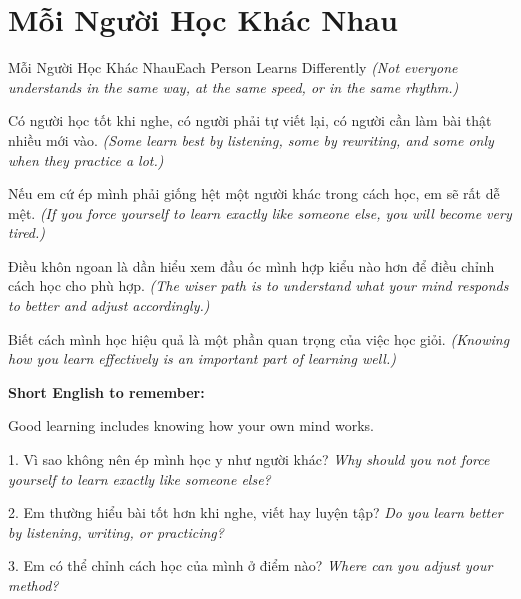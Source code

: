 \section{Mỗi Người Học Khác Nhau}
\begin{truyen}{Mỗi Người Học Khác Nhau}{Each Person Learns Differently}
\textit{(Not everyone understands in the same way, at the same speed, or in the same rhythm.)}

Có người học tốt khi nghe, có người phải tự viết lại, có người cần làm bài thật nhiều mới vào.
\textit{(Some learn best by listening, some by rewriting, and some only when they practice a lot.)}

Nếu em cứ ép mình phải giống hệt một người khác trong cách học, em sẽ rất dễ mệt.
\textit{(If you force yourself to learn exactly like someone else, you will become very tired.)}

Điều khôn ngoan là dần hiểu xem đầu óc mình hợp kiểu nào hơn để điều chỉnh cách học cho phù hợp.
\textit{(The wiser path is to understand what your mind responds to better and adjust accordingly.)}
\end{truyen}

\begin{baihoc}
Biết cách mình học hiệu quả là một phần quan trọng của việc học giỏi.
\textit{(Knowing how you learn effectively is an important part of learning well.)}
\end{baihoc}

\begin{ghinhoanh}
\textbf{Short English to remember:}

Good learning includes knowing how your own mind works.

\end{ghinhoanh}

\begin{tuhocnhanh}
1. Vì sao không nên ép mình học y như người khác? \textit{Why should you not force yourself to learn exactly like someone else?}

2. Em thường hiểu bài tốt hơn khi nghe, viết hay luyện tập? \textit{Do you learn better by listening, writing, or practicing?}

3. Em có thể chỉnh cách học của mình ở điểm nào? \textit{Where can you adjust your method?}
\end{tuhocnhanh}
\ngancach

